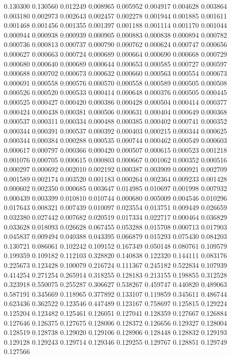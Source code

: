0.130300
0.130560
0.012249
0.008965
0.005952
0.004917
0.004628
0.003864
0.003180
0.002973
0.002643
0.002457
0.002278
0.001944
0.001885
0.001611
0.001468
0.001456
0.001355
0.001397
0.001188
0.001114
0.001170
0.001044
0.000944
0.000938
0.000939
0.000905
0.000883
0.000838
0.000894
0.000782
0.000736
0.000813
0.000737
0.000790
0.000762
0.000624
0.000747
0.000656
0.000627
0.000663
0.000724
0.000689
0.000664
0.000690
0.000668
0.000729
0.000680
0.000640
0.000689
0.000644
0.000653
0.000585
0.000727
0.000597
0.000688
0.000702
0.000673
0.000632
0.000660
0.000563
0.000554
0.000673
0.000691
0.000558
0.000576
0.000570
0.000558
0.000589
0.000505
0.000508
0.000526
0.000520
0.000533
0.000414
0.000648
0.000376
0.000505
0.000445
0.000525
0.000427
0.000420
0.000386
0.000428
0.000504
0.000414
0.000377
0.000424
0.000438
0.000381
0.000506
0.000631
0.000404
0.000649
0.000368
0.000537
0.000311
0.000334
0.000488
0.000385
0.000402
0.000741
0.000352
0.000344
0.000391
0.000537
0.000392
0.000403
0.000215
0.000344
0.000625
0.000344
0.000384
0.000288
0.000535
0.000744
0.000462
0.000549
0.000603
0.000617
0.000797
0.000366
0.000420
0.000507
0.000615
0.000523
0.001218
0.001076
0.000705
0.000615
0.000803
0.000667
0.001062
0.000352
0.000516
0.000297
0.000692
0.002010
0.002192
0.000387
0.003909
0.000921
0.002709
0.001589
0.002174
0.003520
0.001183
0.000264
0.002364
0.009233
0.001428
0.000602
0.002350
0.000685
0.003647
0.014985
0.010697
0.001998
0.007932
0.000439
0.003399
0.010810
0.010744
0.000680
0.005009
0.004546
0.010296
0.017643
0.008321
0.007439
0.010097
0.023554
0.013751
0.009449
0.026659
0.032380
0.027442
0.007682
0.020519
0.017334
0.022717
0.000464
0.036829
0.033628
0.018093
0.026628
0.067455
0.053288
0.015708
0.000713
0.017903
0.045837
0.009494
0.040388
0.043395
0.066879
0.015293
0.075430
0.084203
0.130721
0.086061
0.102242
0.109152
0.167349
0.050148
0.080761
0.109579
0.199359
0.109182
0.112103
0.328820
0.140838
0.122320
0.144111
0.083176
0.225673
0.123428
0.100079
0.216724
0.111367
0.245182
0.522834
0.107939
0.414254
0.271254
0.265914
0.318255
0.128183
0.213155
0.198855
0.312528
0.323918
0.550075
0.255287
0.306627
0.538267
0.459747
0.440820
0.489063
0.587191
0.345669
0.118965
0.377892
0.133107
0.119859
0.345611
0.486744
0.623436
0.362522
0.123546
0.447489
0.123167
0.758697
0.125815
0.129224
0.125204
0.123482
0.125461
0.126051
0.127041
0.128359
0.127667
0.126884
0.127646
0.126375
0.127675
0.128006
0.128372
0.126656
0.129327
0.128004
0.128519
0.128738
0.129020
0.129106
0.128906
0.128448
0.128832
0.129193
0.129128
0.129243
0.129714
0.129346
0.129255
0.129767
0.128851
0.129749
0.127566
